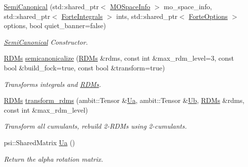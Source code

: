 \begin{DoxyCompactItemize}
\item 
\mbox{\hyperlink{classforte_1_1_semi_canonical_a1da094393f823666e7b346bb53b504e2}{Semi\+Canonical}} (std\+::shared\+\_\+ptr$<$ \mbox{\hyperlink{classforte_1_1_m_o_space_info}{M\+O\+Space\+Info}} $>$ mo\+\_\+space\+\_\+info, std\+::shared\+\_\+ptr$<$ \mbox{\hyperlink{classforte_1_1_forte_integrals}{Forte\+Integrals}} $>$ ints, std\+::shared\+\_\+ptr$<$ \mbox{\hyperlink{classforte_1_1_forte_options}{Forte\+Options}} $>$ options, bool quiet\+\_\+banner=false)
\begin{DoxyCompactList}\small\item\em \mbox{\hyperlink{classforte_1_1_semi_canonical}{Semi\+Canonical}} Constructor. \end{DoxyCompactList}\item 
\mbox{\hyperlink{classforte_1_1_r_d_ms}{R\+D\+Ms}} \mbox{\hyperlink{classforte_1_1_semi_canonical_a6f153bb96586c8dca91749e39bd3f79c}{semicanonicalize}} (\mbox{\hyperlink{classforte_1_1_r_d_ms}{R\+D\+Ms}} \&rdms, const int \&max\+\_\+rdm\+\_\+level=3, const bool \&build\+\_\+fock=true, const bool \&transform=true)
\begin{DoxyCompactList}\small\item\em Transforms integrals and \mbox{\hyperlink{classforte_1_1_r_d_ms}{R\+D\+Ms}}. \end{DoxyCompactList}\item 
\mbox{\hyperlink{classforte_1_1_r_d_ms}{R\+D\+Ms}} \mbox{\hyperlink{classforte_1_1_semi_canonical_a9e3de77a2345f8798d9b09408327cf83}{transform\+\_\+rdms}} (ambit\+::\+Tensor \&\mbox{\hyperlink{classforte_1_1_semi_canonical_af9743982107774c91100d145d2084138}{Ua}}, ambit\+::\+Tensor \&\mbox{\hyperlink{classforte_1_1_semi_canonical_a3e7fd1795a15e6c0515e33e8fc62a257}{Ub}}, \mbox{\hyperlink{classforte_1_1_r_d_ms}{R\+D\+Ms}} \&rdms, const int \&max\+\_\+rdm\+\_\+level)
\begin{DoxyCompactList}\small\item\em Transform all cumulants, rebuild 2-\/\+R\+D\+Ms using 2-\/cumulants. \end{DoxyCompactList}\item 
psi\+::\+Shared\+Matrix \mbox{\hyperlink{classforte_1_1_semi_canonical_af9743982107774c91100d145d2084138}{Ua}} ()
\begin{DoxyCompactList}\small\item\em Return the alpha rotation matrix. \end{DoxyCompactList}\item 

\end{DoxyCompactItemize}

